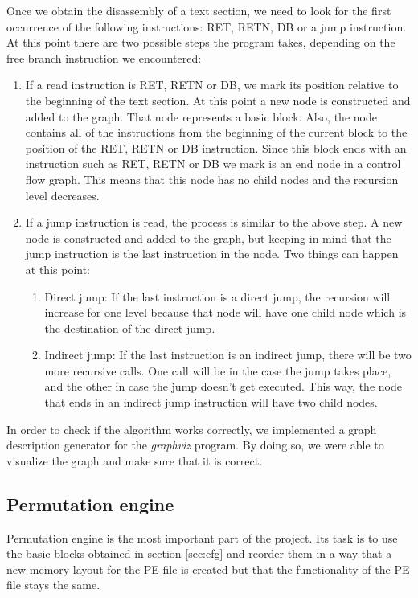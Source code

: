 \documentclass[11pt,final,conference,a4paper]{IEEEtran}
\begin{document}
Once we obtain the disassembly of a text section, we need to look for the first occurrence of the following instructions: RET, RETN, DB or a jump instruction. At this point there are two possible steps the program takes, depending on the free branch instruction we encountered:
\begin{enumerate}
\item If a read instruction is RET, RETN or DB, we mark its position relative to the beginning of the text section. At this point a new node is constructed and added to the graph. That node represents a basic block. Also, the node contains all of the instructions from the beginning of the current block to the position of the RET, RETN or DB instruction. Since this block ends with an instruction such as RET, RETN or DB we mark is an end node in a control flow graph. This means that this node has no child nodes and the recursion level decreases.
\item If a jump instruction is read, the process is similar to the above step. A new node is constructed and added to the graph, but keeping in mind that the jump instruction is the last instruction in the node. Two things can happen at this point:
\begin{enumerate}
\item Direct jump: If the last instruction is a direct jump, the recursion will increase for one level because that node will have one child node which is the destination of the direct jump.
\item Indirect jump: If the last instruction is an indirect jump, there will be two more recursive calls. One call will be in the case the jump takes place, and the other in case the jump doesn't get executed. This way, the node that ends in an indirect jump instruction will have two child nodes.
\end{enumerate}
\end{enumerate}
In order to check if the algorithm works correctly, we implemented a graph description generator for the \emph{graphviz} program. By doing so, we were able to visualize the graph and make sure that it is correct.

\subsection{Permutation engine}
\label{sec:permutator}
Permutation engine is the most important part of the project. Its task is to use the basic blocks obtained in section \ref{sec:cfg} and reorder them in a way that a new memory layout for the PE file is created but that the functionality of the PE file stays the same. 
\end{document}
